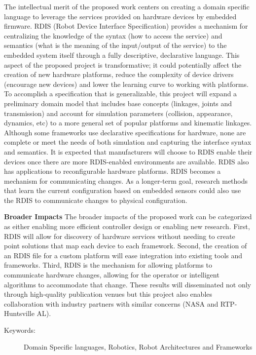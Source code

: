 The intellectual merit of the proposed work centers on creating a domain specific language to leverage the services provided on hardware devices by embedded firmware.  RDIS (Robot Device Interface Specification) provides a mechanism for centralizing the knowledge of the syntax (how to access the service) and semantics (what is the meaning of the input/output of the service) to the embedded system itself through a fully descriptive, declarative language.  This aspect of the proposed project is transformative; it could potentially affect the creation of new hardware platforms, reduce the complexity of device drivers (encourage new devices) and lower the learning curve to working with platforms.   To accomplish a specification that is generalizable, this project will expand a preliminary domain model that includes base concepts (linkages, joints and transmission) and account for simulation parameters (collision, appearance, dynamics, etc) to a more general set of popular platforms and kinematic linkages.  Although some frameworks use declarative specifications for hardware, none are complete or meet the needs of both simulation and capturing the interface syntax and semantics. It is expected that manufacturers will choose to RDIS enable their devices once there are more RDIS-enabled environments are available.  RDIS also has applications to reconfigurable hardware platforms. RDIS becomes a mechanism for communicating changes.  As a longer-term goal, research methods that learn the current configuration based on embedded sensors could also use the RDIS to communicate changes to physical configuration.

\textbf{Broader Impacts}
The broader impacts of the proposed work can be categorized as either enabling more efficient controller design or enabling new research.   First, RDIS will allow for discovery of hardware services without needing to create point solutions that map each device to each framework.  Second, the creation of an RDIS file for a custom platform will ease integration into existing tools and frameworks.  Third, RDIS is the mechanism for allowing platforms to communicate hardware changes, allowing for the operator or intelligent algorithms to accommodate that change.  These results will disseminated not only through high-quality publication venues but this project also enables collaboration with industry partners with similar concerns (NASA and RTP-Huntsville AL).

\begin{description}
	\item[Keywords:]
   Domain Specific languages, Robotics, Robot Architectures and Frameworks
\end{description}
